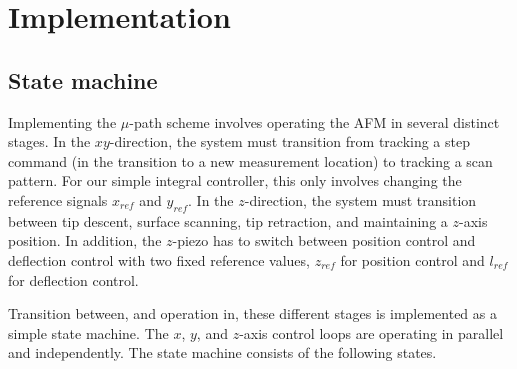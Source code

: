 \documentclass[twocolumn,twoside]{IEEEtran/IEEEtran}
\begin{document}

\section{Implementation}\label{sec:implementation}
	
\subsection{State machine}
Implementing the $\mu$-path scheme involves operating the AFM in several
distinct stages. In the $xy$-direction, the system must transition from tracking
a step command (in the transition to a new measurement location) to tracking a
scan pattern. For our simple integral controller, this only involves changing
the reference signals $x_{ref}$ and $y_{ref}$. In the $z$-direction, the system
must transition between tip descent, surface scanning, tip retraction, and
maintaining a $z$-axis position. In addition, the $z$-piezo has to switch
between position control and deflection control with two fixed reference values,
$z_{ref}$ for position control and $l_{ref}$ for deflection control.
	
Transition between, and operation in, these different stages is implemented as a
simple state machine. The $x$, $y$, and $z$-axis control loops are operating in
parallel and independently. The state machine consists of the following states.
\end{document}
